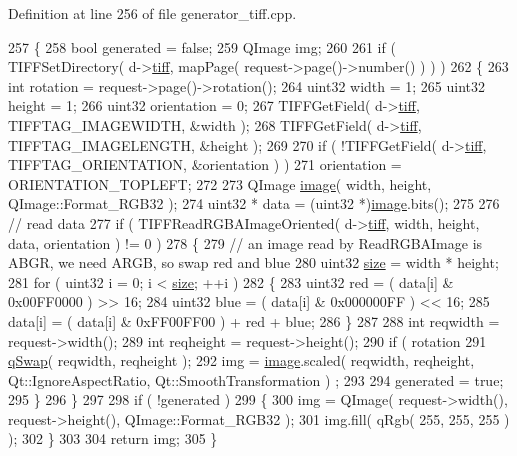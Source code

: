 Definition at line 256 of file generator\+\_\+tiff.\+cpp.


\begin{DoxyCode}
257 \{
258     \textcolor{keywordtype}{bool} generated = \textcolor{keyword}{false};
259     QImage img;
260 
261     \textcolor{keywordflow}{if} ( TIFFSetDirectory( d->\hyperlink{classTIFFGenerator_1_1Private_abe0f02dd2a2177e43a18938d465ef328}{tiff}, mapPage( request->page()->number() ) ) )
262     \{
263         \textcolor{keywordtype}{int} rotation = request->page()->rotation();
264         uint32 width = 1;
265         uint32 height = 1;
266         uint32 orientation = 0;
267         TIFFGetField( d->\hyperlink{classTIFFGenerator_1_1Private_abe0f02dd2a2177e43a18938d465ef328}{tiff}, TIFFTAG\_IMAGEWIDTH, &width );
268         TIFFGetField( d->\hyperlink{classTIFFGenerator_1_1Private_abe0f02dd2a2177e43a18938d465ef328}{tiff}, TIFFTAG\_IMAGELENGTH, &height );
269 
270         \textcolor{keywordflow}{if} ( !TIFFGetField( d->\hyperlink{classTIFFGenerator_1_1Private_abe0f02dd2a2177e43a18938d465ef328}{tiff}, TIFFTAG\_ORIENTATION, &orientation ) )
271             orientation = ORIENTATION\_TOPLEFT;
272 
273         QImage \hyperlink{classTIFFGenerator_aba1b5aafb7e194b48f4b5a8a02e47ddb}{image}( width, height, QImage::Format\_RGB32 );
274         uint32 * data = (uint32 *)\hyperlink{classTIFFGenerator_aba1b5aafb7e194b48f4b5a8a02e47ddb}{image}.bits();
275 
276         \textcolor{comment}{// read data}
277         \textcolor{keywordflow}{if} ( TIFFReadRGBAImageOriented( d->\hyperlink{classTIFFGenerator_1_1Private_abe0f02dd2a2177e43a18938d465ef328}{tiff}, width, height, data, orientation ) != 0 )
278         \{
279             \textcolor{comment}{// an image read by ReadRGBAImage is ABGR, we need ARGB, so swap red and blue}
280             uint32 \hyperlink{synctex__parser_8c_aa23c661441688350614bd6a350d2b6ff}{size} = width * height;
281             \textcolor{keywordflow}{for} ( uint32 i = 0; i < \hyperlink{synctex__parser_8c_aa23c661441688350614bd6a350d2b6ff}{size}; ++i )
282             \{
283                 uint32 red = ( data[i] & 0x00FF0000 ) >> 16;
284                 uint32 blue = ( data[i] & 0x000000FF ) << 16;
285                 data[i] = ( data[i] & 0xFF00FF00 ) + red + blue;
286             \}
287 
288             \textcolor{keywordtype}{int} reqwidth = request->width();
289             \textcolor{keywordtype}{int} reqheight = request->height();
290             \textcolor{keywordflow}{if} ( rotation %
291                 \hyperlink{htmlextension_8h_a6aa0d61b42274f15f4a693b0c7bea484}{qSwap}( reqwidth, reqheight );
292             img = \hyperlink{classTIFFGenerator_aba1b5aafb7e194b48f4b5a8a02e47ddb}{image}.scaled( reqwidth, reqheight, Qt::IgnoreAspectRatio, Qt::SmoothTransformation )
      ;
293 
294             generated = \textcolor{keyword}{true};
295         \}
296     \}
297 
298     \textcolor{keywordflow}{if} ( !generated )
299     \{
300         img = QImage( request->width(), request->height(), QImage::Format\_RGB32 );
301         img.fill( qRgb( 255, 255, 255 ) );
302     \}
303 
304     \textcolor{keywordflow}{return} img;
305 \}
\end{DoxyCode}
